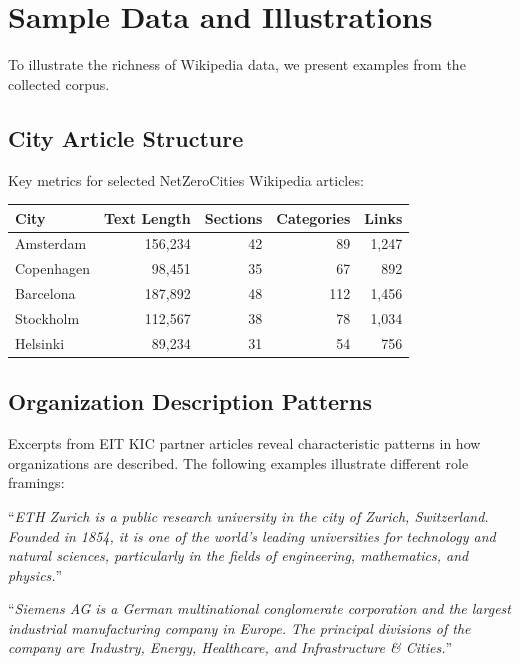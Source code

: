 \section{Sample Data and Illustrations}

To illustrate the richness of Wikipedia data, we present examples from the collected corpus.

\subsection{City Article Structure}

Key metrics for selected NetZeroCities Wikipedia articles:

\begin{center}
\small
\begin{tabular}{lrrrr}
\toprule
\textbf{City} & \textbf{Text Length} & \textbf{Sections} & \textbf{Categories} & \textbf{Links} \\
\midrule
Amsterdam & 156,234 & 42 & 89 & 1,247 \\
Copenhagen & 98,451 & 35 & 67 & 892 \\
Barcelona & 187,892 & 48 & 112 & 1,456 \\
Stockholm & 112,567 & 38 & 78 & 1,034 \\
Helsinki & 89,234 & 31 & 54 & 756 \\
\bottomrule
\end{tabular}
\end{center}

\subsection{Organization Description Patterns}

Excerpts from EIT KIC partner articles reveal characteristic patterns in how organizations are described. The following examples illustrate different role framings:

\begin{kaobox}[frametitle=Example: Research Institution Role]
``\textit{ETH Zurich is a public research university in the city of Zurich, Switzerland. Founded in 1854, it is one of the world's leading universities for technology and natural sciences, particularly in the fields of engineering, mathematics, and physics.}''
\end{kaobox}

\begin{kaobox}[frametitle=Example: Industry Partner Role]
``\textit{Siemens AG is a German multinational conglomerate corporation and the largest industrial manufacturing company in Europe. The principal divisions of the company are Industry, Energy, Healthcare, and Infrastructure \& Cities.}''
\end{kaobox}

